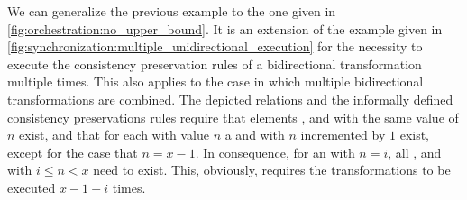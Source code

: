 We can generalize the previous example to the one given in \autoref{fig:orchestration:no_upper_bound}.
It is an extension of the example given in \autoref{fig:synchronization:multiple_unidirectional_execution} for the necessity to execute the consistency preservation rules of a bidirectional transformation multiple times.
This also applies to the case in which multiple bidirectional transformations are combined.
The depicted relations and the informally defined consistency preservations rules require that elements ,  and  with the same value of $n$ exist, and that for each  with value $n$ a  and  with $n$ incremented by $1$ exist, except for the case that $n = x-1$.
In consequence, for an  with $n = i$, all ,  and  with $i \leq n < x$ need to exist.
This, obviously, requires the transformations to be executed $x-1-i$ times.

